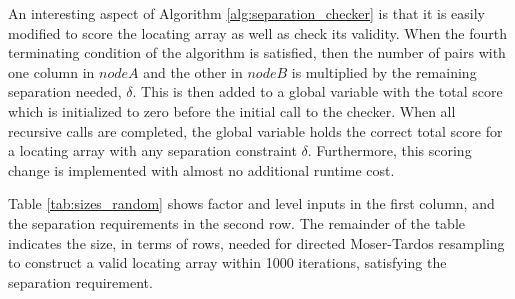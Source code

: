 An interesting aspect of Algorithm \ref{alg:separation_checker} is that it is easily modified to score the locating array as well as check its validity.
When the fourth terminating condition of the algorithm is satisfied, then the number of pairs with one column in $\mathit{nodeA}$ and the other in $\mathit{nodeB}$ is multiplied by the remaining separation needed, $\delta$.
This is then added to a global variable with the total score which is initialized to zero before the initial call to the checker.
When all recursive calls are completed, the global variable holds the correct total score for a locating array with any separation constraint $\delta$.
Furthermore, this scoring change is implemented with almost no additional runtime cost.

Table \ref{tab:sizes_random} shows factor and level inputs in the first column, and the separation requirements in the second row.
The remainder of the table indicates the size, in terms of rows, needed for directed Moser-Tardos resampling to construct a valid locating array within 1000 iterations, satisfying the separation requirement.

